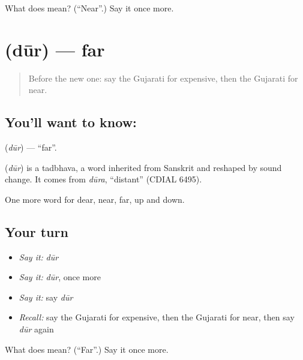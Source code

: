 \begin{tcolorbox}[breakable,colback=teal!4,colframe=teal!35!black,title={Before you move on}]
What does  mean? (\textquotedblleft{}Near\textquotedblright{}.) Say it once more.
\end{tcolorbox}
\section[\texorpdfstring{\gu{દૂર} (dūr)}{દૂર (dūr)}]{ (dūr) — far}

\label{lesson:GU-C74-far}



\begin{quote}
Before the new one: say the Gujarati for expensive, then the Gujarati for near.
\end{quote}

\subsection*{You'll want to know: }
\textbf{} (\emph{dūr}) — \textquotedblleft{}far\textquotedblright{}.

\begin{cousinweb}
\textbf{} (\emph{dūr}) is a tadbhava, a word inherited from Sanskrit and reshaped by sound change. It comes from \emph{dūra}, \textquotedblleft{}distant\textquotedblright{} (CDIAL 6495).
\end{cousinweb}

\begin{grammarlens}[title={What you've built}]
One more word for dear, near, far, up and down.
\end{grammarlens}

\subsection*{Your turn}
\begin{itemize}
\raggedright
  \item \emph{Say it:} \emph{dūr}
  \item \emph{Say it:} \emph{dūr}, once more
  \item \emph{Say it:} say \emph{dūr}
  \item \emph{Recall:} say the Gujarati for expensive, then the Gujarati for near, then say \emph{dūr} again
\end{itemize}

\begin{tcolorbox}[breakable,colback=teal!4,colframe=teal!35!black,title={Before you move on}]
What does  mean? (\textquotedblleft{}Far\textquotedblright{}.) Say it once more.
\end{tcolorbox}
